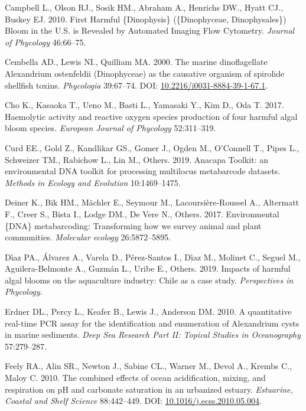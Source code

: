 \documentclass[
]{article}
\begin{document}
\leavevmode\hypertarget{ref-campbell2010first}{}%
Campbell L., Olson RJ., Sosik HM., Abraham A., Henrichs DW., Hyatt CJ.,
Buskey EJ. 2010. First Harmful \{Dinophysis\} (\{Dinophyceae,
Dinophysales\}) Bloom in the U.S. is Revealed by Automated Imaging Flow
Cytometry. \emph{Journal of Phycology} 46:66--75.

\leavevmode\hypertarget{ref-Cembella2000}{}%
Cembella AD., Lewis NI., Quilliam MA. 2000. The marine dinoflagellate
Alexandrium ostenfeldii (Dinophyceae) as the causative organism of
spirolide shellfish toxins. \emph{Phycologia} 39:67--74. DOI:
\href{https://doi.org/10.2216/i0031-8884-39-1-67.1}{10.2216/i0031-8884-39-1-67.1}.

\leavevmode\hypertarget{ref-cho2017haemolytic}{}%
Cho K., Kasaoka T., Ueno M., Basti L., Yamasaki Y., Kim D., Oda T. 2017.
Haemolytic activity and reactive oxygen species production of four
harmful algal bloom species. \emph{European Journal of Phycology}
52:311--319.

\leavevmode\hypertarget{ref-curd2019anacapa}{}%
Curd EE., Gold Z., Kandlikar GS., Gomer J., Ogden M., O'Connell T.,
Pipes L., Schweizer TM., Rabichow L., Lin M., Others. 2019. Anacapa
Toolkit: an environmental DNA toolkit for processing multilocus
metabarcode datasets. \emph{Methods in Ecology and Evolution}
10:1469--1475.

\leavevmode\hypertarget{ref-deiner2017environmental}{}%
Deiner K., Bik HM., Mächler E., Seymour M., Lacoursière-Roussel A.,
Altermatt F., Creer S., Bista I., Lodge DM., De Vere N., Others. 2017.
Environmental \{DNA\} metabarcoding: Transforming how we survey animal
and plant communities. \emph{Molecular ecology} 26:5872--5895.

\leavevmode\hypertarget{ref-diaz2019impacts}{}%
Dìaz PA., Álvarez A., Varela D., Pérez-Santos I., Dìaz M., Molinet C.,
Seguel M., Aguilera-Belmonte A., Guzmán L., Uribe E., Others. 2019.
Impacts of harmful algal blooms on the aquaculture industry: Chile as a
case study. \emph{Perspectives in Phycology}.

\leavevmode\hypertarget{ref-erdner2010quantitative}{}%
Erdner DL., Percy L., Keafer B., Lewis J., Anderson DM. 2010. A
quantitative real-time PCR assay for the identification and enumeration
of Alexandrium cysts in marine sediments. \emph{Deep Sea Research Part
II: Topical Studies in Oceanography} 57:279--287.

\leavevmode\hypertarget{ref-feely2010}{}%
Feely RA., Alin SR., Newton J., Sabine CL., Warner M., Devol A., Krembs
C., Maloy C. 2010. The combined effects of ocean acidification, mixing,
and respiration on pH and carbonate saturation in an urbanized estuary.
\emph{Estuarine, Coastal and Shelf Science} 88:442--449. DOI:
\href{https://doi.org/10.1016/j.ecss.2010.05.004}{10.1016/j.ecss.2010.05.004}.
\end{document}
